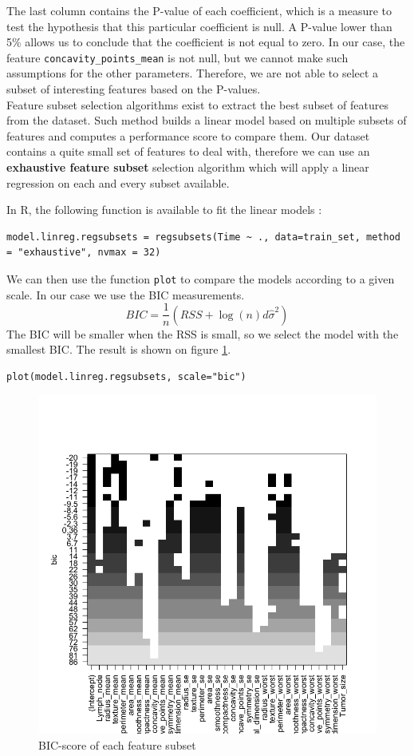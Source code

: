 \documentclass[]{report}
\begin{document}
The last column contains the P-value of each coefficient, which is a measure to test the hypothesis that this particular coefficient is null. A P-value lower than 5\% allows us to conclude that the coefficient is not equal to zero. In our case, the feature \texttt{concavity\_points\_mean} is not null, but we cannot make such assumptions for the other parameters. Therefore, we are not able to select a subset of interesting features based on the P-values. \\

Feature subset selection algorithms exist to extract the best subset of features from the dataset. Such method builds a linear model based on multiple subsets of features and computes a performance score to compare them. Our dataset contains a quite small set of features to deal with, therefore we can use an \textbf{exhaustive feature subset} selection algorithm which will apply a linear regression on each and every subset available.

In R, the following function is available to fit the linear models :
\begin{lstlisting}
model.linreg.regsubsets = regsubsets(Time ~ ., data=train_set, method = "exhaustive", nvmax = 32)
\end{lstlisting}

We can then use the function \texttt{plot} to compare the models according to a given scale. In our case we use the BIC measurements. $$BIC = \frac{1}{n} (RSS + \log(n)d\hat{\sigma}^{2}) $$
The BIC will be smaller when the RSS is small, so we select the model with the smallest BIC. The result is shown on figure \ref{fig:subset_bic}.

\begin{lstlisting}
plot(model.linreg.regsubsets, scale="bic")	
\end{lstlisting}

\begin{figure}[!h]
	\centering
	\includegraphics[width=0.8\linewidth]{Figures/subset_bic.png}
	\caption{BIC-score of each feature subset}
	\label{fig:subset_bic}
\end{figure}
\end{document}
